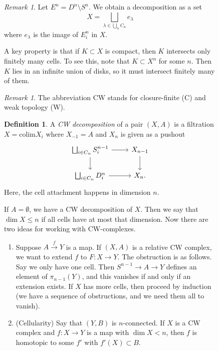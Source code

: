 \documentclass[leqno, openany]{memoir}
\theoremstyle{definition}
\newtheorem{defn}[thm]{Definition}
\theoremstyle{remark}
\newtheorem{rmk}[thm]{Remark}
\theoremstyle{plain}
\theoremstyle{definition}
\theoremstyle{remark}
\newcommand{\mr}[1]{\mathrm{#1}}
\begin{document}
\begin{figure}[H]
\begin{rmk} Let $E^n = D^n \setminus S^n$. We obtain a decomposition as a set
    \[ X = \bigsqcup_{\lambda \in \bigcup_n C_n} e_{\lambda} \] where
$e_{\lambda}$ is the image of $E_i^n$ in $X$.  \end{rmk}

A key property is that if $K \subset X$ is compact, then $K$ intersects only
finitely many cells. To see this, note that $K \subset X^n$ for some $n$. Then
$K$ lies in an infinite union of disks, so it must intersect finitely many of
them.

\begin{rmk} The abbreviation CW stands for closure-finite (C) and weak topology
(W).  \end{rmk}

\begin{defn} A \textit{CW decomposition} of a pair $(X,A)$ is a filtration $X =
    \mr{colim} X_i$ where $X_{-1} = A$ and $X_n$ is given as a pushout
    \begin{equation*} \begin{tikzcd} \bigsqcup_{i \in C_n} S_i^{n-1} \arrow{r}
        \arrow{d} & X_{n-1} \arrow{d} \\ \bigsqcup_{i \in C_n} D_i^n \arrow{r}
                  & X_n.  \end{tikzcd} \end{equation*} Here, the cell
              attachment happens in dimension $n$.  \end{defn}

If $A = \emptyset$, we have a CW decomposition of $X$. Then we say that $\dim X
\leq n$ if all cells have at most that dimension. Now there are two ideas for
working with CW-complexes.

\begin{enumerate} \item Suppose $A \xrightarrow{f} Y$ is a map. If $(X,A)$ is a
    relative CW complex, we want to extend $f$ to $F \colon X \to Y$. The
    obstruction is as follows. Say we only have one cell. Then $S^{n-1} \to A
    \to Y$ defines an element of $\pi_{n-1}(Y)$, and this vanishes if and only
    if an extension exists. If $X$ has more cells, then proceed by induction
    (we have a sequence of obstructions, and we need them all to vanish).
\item (Cellularity) Say that $(Y,B)$ is $n$-connected. If $X$ is a CW complex
    and $f \colon X \to Y$ is a map with $\dim X < n$, then $f$ is homotopic to
    some $f'$ with $f'(X) \subset B$.


\end{enumerate}
\end{figure}
\end{document}
